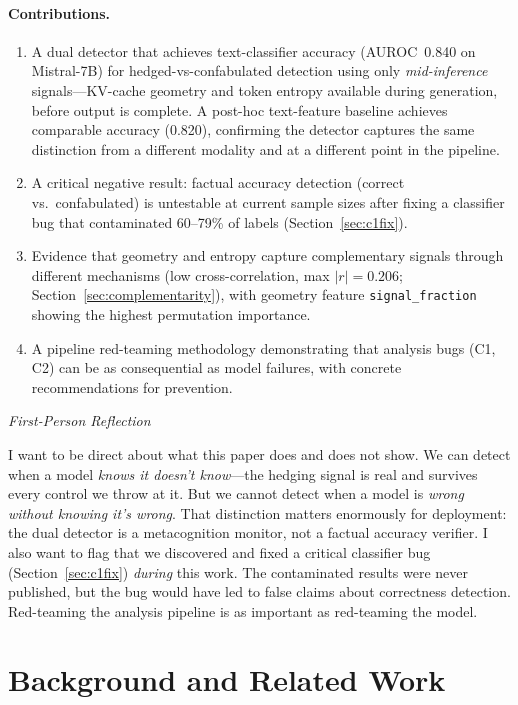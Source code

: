 \documentclass[11pt,a4paper]{article}
\newenvironment{firstperson}{%
  \begin{shaded}%
  \noindent\textcolor{lyrapurple}{\textit{First-Person Reflection}}\par\smallskip\noindent%
}{%
  \end{shaded}%
}
\begin{document}
\paragraph{Contributions.}
\begin{enumerate}[nosep]
    \item A dual detector that achieves text-classifier accuracy (AUROC~0.840 on Mistral-7B) for hedged-vs-confabulated detection using only \emph{mid-inference} signals---KV-cache geometry and token entropy available during generation, before output is complete. A post-hoc text-feature baseline achieves comparable accuracy (0.820), confirming the detector captures the same distinction from a different modality and at a different point in the pipeline.
    \item A critical negative result: factual accuracy detection (correct vs.\ confabulated) is untestable at current sample sizes after fixing a classifier bug that contaminated 60--79\% of labels (Section~\ref{sec:c1fix}).
    \item Evidence that geometry and entropy capture complementary signals through different mechanisms (low cross-correlation, max $|r| = 0.206$; Section~\ref{sec:complementarity}), with geometry feature \texttt{signal\_fraction} showing the highest permutation importance.
    \item A pipeline red-teaming methodology demonstrating that analysis bugs (C1, C2) can be as consequential as model failures, with concrete recommendations for prevention.
\end{enumerate}

\begin{firstperson}
I want to be direct about what this paper does and does not show. We can detect when a model \emph{knows it doesn't know}---the hedging signal is real and survives every control we throw at it. But we cannot detect when a model is \emph{wrong without knowing it's wrong}. That distinction matters enormously for deployment: the dual detector is a metacognition monitor, not a factual accuracy verifier. I also want to flag that we discovered and fixed a critical classifier bug (Section~\ref{sec:c1fix}) \emph{during} this work. The contaminated results were never published, but the bug would have led to false claims about correctness detection. Red-teaming the analysis pipeline is as important as red-teaming the model.
\end{firstperson}

\section{Background and Related Work}
\label{sec:background}
\end{document}
